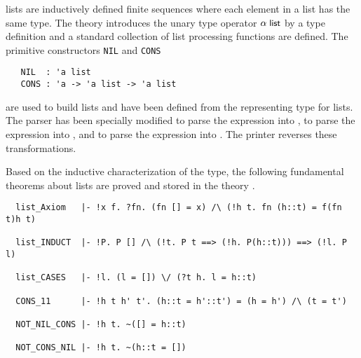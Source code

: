 \HOL{} lists are inductively defined finite sequences where each
element in a list has the same type. The theory  introduces
the unary type operator $\alpha \; \mbox{\small{\textbf{\sf{list}}}}$ by a type definition
and a standard collection of list processing functions are
defined. The primitive constructors {\small\verb+NIL+} and {\small\verb+CONS+}
%
\begin{hol}
{\small
\begin{verbatim}
   NIL  : 'a list
   CONS : 'a -> 'a list -> 'a list
\end{verbatim}
}\end{hol}
%
are used to build lists and have been defined from the representing type for
lists. The \HOL{} parser
%
%
has been specially modified to parse the expression \holtxt{[]} into
, to parse the expression  into , and to parse the expression \holtxt{[$t_1$;$t_2$;\dots;$t_n$]}
into .  The \HOL{} printer
%
%
reverses these transformations.

Based on the inductive characterization of the type, the following
fundamental theorems about lists
are proved and stored in the theory .

\begin{hol}
{\small
\begin{verbatim}
  list_Axiom   |- !x f. ?fn. (fn [] = x) /\ (!h t. fn (h::t) = f(fn t)h t)

  list_INDUCT  |- !P. P [] /\ (!t. P t ==> (!h. P(h::t))) ==> (!l. P l)

  list_CASES   |- !l. (l = []) \/ (?t h. l = h::t)

  CONS_11      |- !h t h' t'. (h::t = h'::t') = (h = h') /\ (t = t')

  NOT_NIL_CONS |- !h t. ~([] = h::t)

  NOT_CONS_NIL |- !h t. ~(h::t = [])
\end{verbatim}
}
\end{hol}

